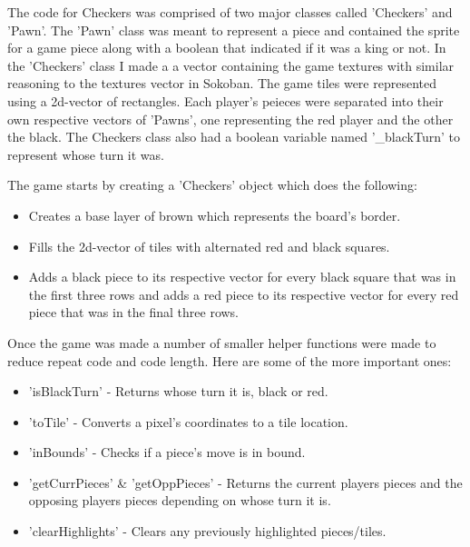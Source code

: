 The code for Checkers was comprised of two major classes called 'Checkers' and 'Pawn'.
The 'Pawn' class was meant to represent a piece and contained the sprite for a game piece along with a boolean that indicated if it was a king or not.
In the 'Checkers' class I made a a vector containing the game textures with similar reasoning to the textures vector in Sokoban.
The game tiles were represented using a 2d-vector of rectangles.
Each player's peieces were separated into their own respective vectors of 'Pawns', one representing the red player and the other the black.
The Checkers class also had a boolean variable named '\_blackTurn' to represent whose turn it was.

The game starts by creating a 'Checkers' object which does the following:
\begin{itemize}
\item Creates a base layer of brown which represents the board's border.
\item Fills the 2d-vector of tiles with alternated red and black squares.
\item Adds a black piece to its respective vector for every black square that was in the first three rows and adds a red piece to its respective vector for every red piece that was in the final three rows.
\end{itemize}

Once the game was made a number of smaller helper functions were made to reduce repeat code and code length.
Here are some of the more important ones:
\begin{itemize}
\item 'isBlackTurn' - Returns whose turn it is, black or red.
\item 'toTile' - Converts a pixel's coordinates to a tile location.
\item 'inBounds' - Checks if a piece's move is in bound.
\item 'getCurrPieces' \& 'getOppPieces' - Returns the current players pieces and the opposing players pieces depending on whose turn it is.
\item 'clearHighlights' - Clears any previously highlighted pieces/tiles.
\end{itemize}

